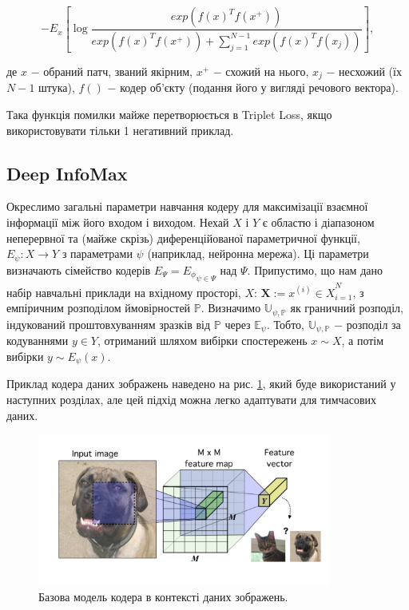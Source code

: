 \begin{equation}\label{eq:infonce}
-E_{x}\left[ \log{\frac{exp(f(x)^{T}f(x^{+}))}{exp(f(x)^{T}f(x^{+}))+\sum_{j=1}^{N-1}exp(f(x)^{T}f(x_{j}))}} \right],
\end{equation}

\noindent де $x$ $-$ обраний патч, званий якірним, \newline
\hspace*{15pt} $x^{+}$ $-$ схожий на нього, \newline
\hspace*{15pt} $x_{j}$ $-$ несхожий (їх $N-1$ штука), \newline
\hspace*{15pt} $f()$ $-$ кодер об'єкту (подання його у вигляді речового вектора). 

\vspace{1.5em}

Така функція помилки майже перетворюється в Triplet Loss, якщо використовувати тільки 1 негативний приклад.

\subsection{Deep InfoMax}

Окреслимо загальні параметри навчання кодеру для максимізації взаємної інформації між його входом і виходом. Нехай $X$ і $Y$ є областю і діапазоном неперервної та (майже скрізь) диференційованої параметричної функції, $E_{\psi}: X \rightarrow Y$ з параметрами $\psi$ (наприклад, нейронна мережа). Ці параметри визначають сімейство кодерів $E_{\Psi} = {E_{\phi}}_{\psi \in \Psi}$ над $\Psi$. Припустимо, що нам дано набір навчальні приклади на вхідному просторі, $X$: $\mathbf{X} := {x^{(i)} \in X}^{N}_{i = 1}$, з емпіричним розподілом ймовірностей $\mathbb{P}$. Визначимо $\mathbb{U_{\psi,P}}$ як граничний розподіл, індукований проштовхуванням зразків від $\mathbb{P}$ через $\mathbb{E_{\psi}}$. Тобто, $\mathbb{U_{\psi, P}}$ $-$ розподіл за кодуваннями $y \in Y$, отриманий шляхом вибірки спостережень $x \sim X$, а потім вибірки $y \sim E_{\psi}(x)$.

Приклад кодера даних зображень наведено на рис. \ref{fig:deepinfo1}, який буде використаний у наступних розділах, але цей підхід можна легко адаптувати для тимчасових даних. 

\vspace{1em}

\begin{figure}[h]
  \includegraphics[width=\textwidth, height=5cm, natwidth=277, natheight=144]{Mal/deepinfo1.jpg}
  \caption{Базова модель кодера в контексті даних зображень.}
  \label{fig:deepinfo1}
\end{figure}

